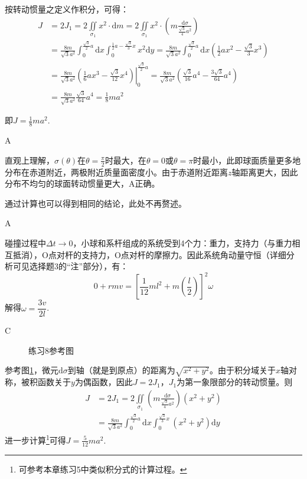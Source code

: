 \documentclass[b5paper,opensource,sourcefont,parskip]{qyxf-book}
\newcommand{\di}[1]{\mathrm{d}#1}
\newcommand{\zbj}[4]
{
	\draw (0,0) node[below left] {$ O $};
	\draw [->] (#1,0) -- (#2,0) node[right] {$ x $};
	\draw [->] (0,#3) -- (0,#4) node[right] {$ y $};
}
\begin{document}
按转动惯量之定义作积分，可得：
\begin{align*}
J&=2J_1=2\iint\limits_{\sigma_1}x^2\cdot\di{m}=2\iint\limits_{\sigma_1}x^2\cdot\left(m\frac{\di{\sigma}}{\frac{\sqrt{3}}{4}a^2}\right)\\
&=\frac{8m}{\sqrt{3}a^2}\int_0^{\frac{\sqrt{3}}{2}a}\di{x}\int_0^{\frac{1}{2}a-\frac{\sqrt{3}}{3}x}x^2\di{y}=\frac{8m}{\sqrt{3}a^2}\int_0^{\frac{\sqrt{3}}{2}a}\di{x}\left(\frac{1}{2}ax^2-\frac{\sqrt{3}}{3}x^3\right)\\
&=\frac{8m}{\sqrt{3}a^2}\left.\left(\frac{1}{6}ax^3-\frac{\sqrt{3}}{12}x^4\right)\right|_0^{\frac{\sqrt{3}}{2}a}=\frac{8m}{\sqrt{3}a^2}\left(\frac{\sqrt{3}}{16}a^4-\frac{3\sqrt{3}}{64}a^4\right)\\
&=\frac{8m}{\sqrt{3}a^2}\frac{\sqrt{3}}{64}a^4=\frac{1}{8}ma^2
\end{align*}

即$ J=\frac{1}{8}ma^2 $.

A

\solve 直观上理解，$ \sigma(\theta) $在$ \theta=\frac{\pi}{2} $时最大，在$ \theta=0 $或$ \theta=\pi $时最小，此即球面质量更多地分布在赤道附近，两极附近质量面密度小。由于赤道附近距离$ z $轴距离更大，因此分布不均匀的球面转动惯量更大，A正确。\par
通过计算也可以得到相同的结论，此处不再赘述。

A

\solve 碰撞过程中$ \Delta t\to 0 $，小球和系杆组成的系统受到4个力：重力，支持力（与重力相互抵消），O点对杆的支持力，O点对杆的摩擦力。因此系统角动量守恒（详细分析可见选择题3的“注”部分），有：
\[0+rmv=\left[\frac{1}{12}ml^2+m\left(\frac{l}{2}\right)\right]^2\omega\]
解得$\omega=\dfrac{3v}{2l}$.
		
C

\begin{figure}[htbp]
\centering
{}
\caption{练习8参考图}\label{fig:c4-t8}
\end{figure}

\solve 参考图\ref{fig:c4-t8}，微元$ \di{\sigma} $到轴（就是到原点）的距离为$ \sqrt{x^2+y^2} $。由于积分域关于$ x $轴对称，被积函数关于$ y $为偶函数，因此$ J=2J_1 $，$ J_1 $为第一象限部分的转动惯量。则
\begin{align*}
J&=2J_1=2\iint\limits_{\sigma_1}\left(m\frac{\di{\sigma}}{\frac{\sqrt{3}}{4}a^2}\right)(x^2+y^2)\\
&=\frac{8m}{\sqrt{3}a^2}\int_0^{\frac{\sqrt{3}}{2}a}\di{x}\int_0^{\frac{\sqrt{3}}{3}x}(x^2+y^2)\di{y}
\end{align*}
进一步计算\footnote{可参考本章练习5中类似积分式的计算过程。}可得$ J=\frac{5}{12}ma^2 $.
\end{document}
